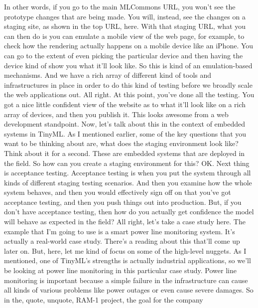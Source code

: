 {{{{    In other words, if you go to the main MLCommons URL,
    you won't see the prototype changes that are being made.
    You will, instead, see the changes on a staging site, as shown in the top URL,
    here.
    With that staging URL, what you can then do
    is you can emulate a mobile view of the web page,
    for example, to check how the rendering actually happens
    on a mobile device like an iPhone.
    You can go to the extent of even picking the particular device
    and then having the device kind of show you what it'll look like.
    So this is kind of an emulation-based mechanisms.
    And we have a rich array of different kind of tools and infrastructures
    in place in order to do this kind of testing before we broadly
    scale the web applications out.
    All right.
    At this point, you've done all the testing.
    You got a nice little confident view of the website
    as to what it'll look like on a rich array of devices,
    and then you publish it.
    This looks awesome from a web development standpoint.
    Now, let's talk about this in the context of embedded systems in TinyML.
    As I mentioned earlier, some of the key questions that you
    want to be thinking about are, what does the staging environment look like?
    Think about it for a second.
    These are embedded systems that are deployed in the field.
    So how can you create a staging environment for this?
    OK.
    Next thing is acceptance testing.
    Acceptance testing is when you put the system through all kinds
    of different staging testing scenarios.
    And then you examine how the whole system behaves,
    and then you would effectively sign off on that you've got acceptance testing,
    and then you push things out into production.
    But, if you don't have acceptance testing,
    then how do you actually get confidence the model
    will behave as expected in the field?
    All right, let's take a case study here.
    The example that I'm going to use is a smart power line monitoring system.
    It's actually a real-world case study.
    There's a reading about this that'll come up later on.
    But, here, let me kind of focus on some of the high-level nuggets.
    As I mentioned, one of TinyML's strengths
    is actually industrial applications, so we'll
    be looking at power line monitoring in this particular case study.
    Power line monitoring is important because a simple failure
    in the infrastructure can cause all kinds of various problems
    like power outages or even cause severe damages.
    So in the, quote, unquote, RAM-1 project, the goal for the company
}}}}
